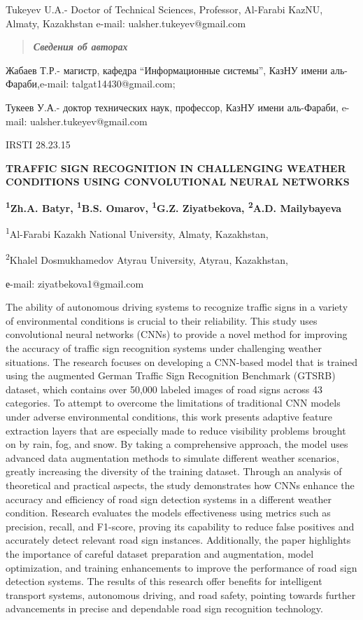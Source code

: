 Tukeyev U.A.- Doctor of Technical Sciences, Professor, Al-Farabi KazNU,
Almaty, Kazakhstan e-mail: ualsher.tukeyev@gmail.com

\begin{quote}
\emph{\textbf{Сведения об авторах}}
\end{quote}

Жабаев Т.Р.- магистр, кафедра ``Информационные системы'', КазНУ имени
аль-Фараби,e-mail: talgat14430@gmail.com;

Тукеев У.А.- доктор технических наук, профессор, КазНУ имени аль-Фараби,
e-mail: ualsher.tukeyev@gmail.com

IRSTI 28.23.15

\textbf{TRAFFIC SIGN RECOGNITION IN CHALLENGING WEATHER CONDITIONS USING
CONVOLUTIONAL NEURAL NETWORKS}

\textbf{\textsuperscript{1}Zh.A. Batyr, \textsuperscript{1}B.S. Omarov,
\textsuperscript{1}G.Z. Ziyatbekova, \textsuperscript{2}A.D.
Mailybayeva}

\textsuperscript{1}Al-Farabi Kazakh National University, Almaty,
Kazakhstan,

\textsuperscript{2}Khalel Dosmukhamedov Atyrau University, Atyrau,
Kazakhstan,

е-mail: ziyatbekova1@gmail.com

The ability of autonomous driving systems to recognize traffic signs in
a variety of environmental conditions is crucial to their reliability.
This study uses convolutional neural networks (CNNs) to provide a novel
method for improving the accuracy of traffic sign recognition systems
under challenging weather situations. The research focuses on developing
a CNN-based model that is trained using the augmented German Traffic
Sign Recognition Benchmark (GTSRB) dataset, which contains over 50,000
labeled images of road signs across 43 categories. To attempt to
overcome the limitations of traditional CNN models under adverse
environmental conditions, this work presents adaptive feature extraction
layers that are especially made to reduce visibility problems brought on
by rain, fog, and snow. By taking a comprehensive approach, the model
uses advanced data augmentation methods to simulate different weather
scenarios, greatly increasing the diversity of the training dataset.
Through an analysis of theoretical and practical aspects, the study
demonstrates how CNNs enhance the accuracy and efficiency of road sign
detection systems in a different weather condition. Research evaluates
the model\textquotesingle s effectiveness using metrics such as
precision, recall, and F1-score, proving its capability to reduce false
positives and accurately detect relevant road sign instances.
Additionally, the paper highlights the importance of careful dataset
preparation and augmentation, model optimization, and training
enhancements to improve the performance of road sign detection systems.
The results of this research offer benefits for intelligent transport
systems, autonomous driving, and road safety, pointing towards further
advancements in precise and dependable road sign recognition technology.

